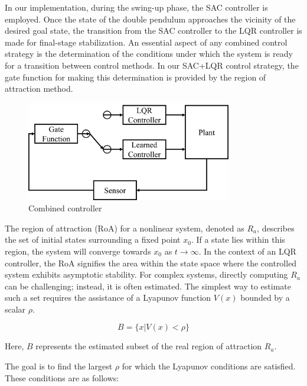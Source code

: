 In our implementation, during the swing-up phase, the SAC controller is employed. Once the state of the double pendulum approaches the vicinity of the desired goal state, the transition from the SAC controller to the LQR controller is made for final-stage stabilization. An essential aspect of any combined control strategy is the determination of the conditions under which the system is ready for a transition between control methods. In our SAC+LQR control strategy, the gate function for making this determination is provided by the region of attraction method\cite{maywald2022co}.

\begin{figure}[H]
    \centering
    \includegraphics[width=0.8\textwidth]{figures/methodology/combined_controller.png}
    \caption{Combined controller}
    \label{fig:combined_controller}
\end{figure}

The region of attraction (RoA) for a nonlinear system, denoted as \(R_a\), describes the set of initial states surrounding a fixed point \(x_0\). If a state lies within this region, the system will converge towards \(x_0\) as \(t \rightarrow \infty\). In the context of an LQR controller, the RoA signifies the area within the state space where the controlled system exhibits asymptotic stability. For complex systems, directly computing \(R_a\) can be challenging; instead, it is often estimated. The simplest way to estimate such a set requires the assistance of a Lyapunov function \(V(x)\) bounded by a scalar \(\rho\)\cite{khalil2002nonlinear}.

\begin{equation}
 B = \{x|V(x)<\rho\}
\end{equation}

Here, \(B\) represents the estimated subset of the real region of attraction \(R_a\). 

The goal is to find the largest \(\rho\) for which the Lyapunov conditions are satisfied. These conditions are as follows:

